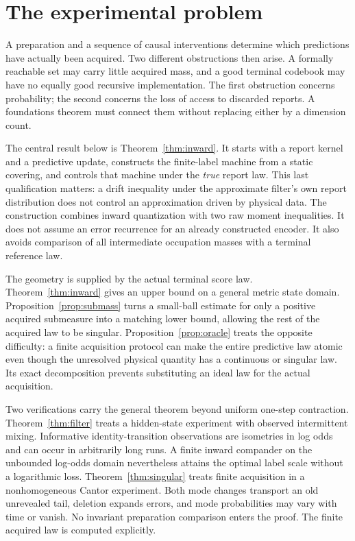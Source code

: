 \section{The experimental problem}\label{sec:problem}
A preparation and a sequence of causal interventions determine which predictions have actually been acquired. Two different obstructions then arise. A formally reachable set may carry little acquired mass, and a good terminal codebook may have no equally good recursive implementation. The first obstruction concerns probability; the second concerns the loss of access to discarded reports. A foundations theorem must connect them without replacing either by a dimension count.

The central result below is Theorem~\ref{thm:inward}. It starts with a report kernel and a predictive update, constructs the finite-label machine from a static covering, and controls that machine under the \emph{true} report law. This last qualification matters: a drift inequality under the approximate filter's own report distribution does not control an approximation driven by physical data. The construction combines inward quantization with two raw moment inequalities. It does not assume an error recurrence for an already constructed encoder. It also avoids comparison of all intermediate occupation masses with a terminal reference law.

The geometry is supplied by the actual terminal score law. Theorem~\ref{thm:inward} gives an upper bound on a general metric state domain. Proposition~\ref{prop:submass} turns a small-ball estimate for only a positive acquired submeasure into a matching lower bound, allowing the rest of the acquired law to be singular. Proposition~\ref{prop:oracle} treats the opposite difficulty: a finite acquisition protocol can make the entire predictive law atomic even though the unresolved physical quantity has a continuous or singular law. Its exact decomposition prevents substituting an ideal law for the actual acquisition.

Two verifications carry the general theorem beyond uniform one-step contraction. Theorem~\ref{thm:filter} treats a hidden-state experiment with observed intermittent mixing. Informative identity-transition observations are isometries in log odds and can occur in arbitrarily long runs. A finite inward compander on the unbounded log-odds domain nevertheless attains the optimal label scale without a logarithmic loss. Theorem~\ref{thm:singular} treats finite acquisition in a nonhomogeneous Cantor experiment. Both mode changes transport an old unrevealed tail, deletion expands errors, and mode probabilities may vary with time or vanish. No invariant preparation comparison enters the proof. The finite acquired law is computed explicitly.

